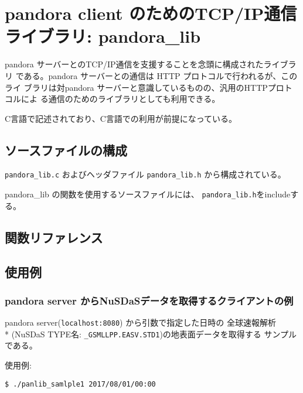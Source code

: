\section{pandora client のためのTCP/IP通信ライブラリ: pandora\_lib}
\label{pandora_lib}
pandora サーバーとのTCP/IP通信を支援することを念頭に構成されたライブラリ
である。pandora サーバーとの通信は HTTP プロトコルで行われるが、このライ
ブラリは対pandora サーバーと意識しているものの、汎用のHTTPプロトコルによ
る通信のためのライブラリとしても利用できる。

C言語で記述されており、C言語での利用が前提になっている。

\subsection{ソースファイルの構成}
{\tt pandora\_lib.c} およびヘッダファイル {\tt pandora\_lib.h} 
から構成されている。

pandora\_lib の関数を使用するソースファイルには、
{\tt pandora\_lib.h}をincludeする。

\subsection{関数リファレンス}


\subsection{使用例}
\subsubsection{pandora server からNuSDaSデータを取得するクライアントの例}
pandora server({\tt localhost:8080}) から引数で指定した日時の
全球速報解析 \\*
(NuSDaS TYPE名: {\tt \_GSMLLPP.EASV.STD1})の地表面データを取得する
サンプルである。

使用例:
\begin{verbatim}
$ ./panlib_samlple1 2017/08/01/00:00
\end{verbatim}

